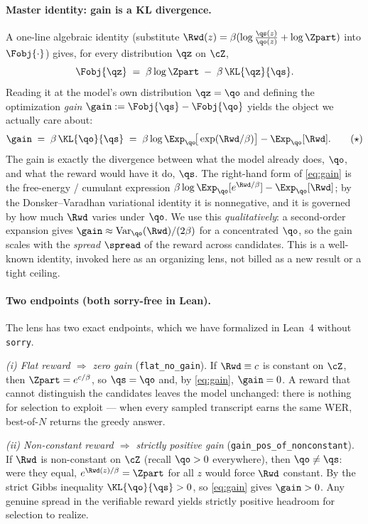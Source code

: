 \paragraph{Master identity: gain is a KL divergence.}
A one-line algebraic identity (substitute $\Rwd(z)=\beta(\log\tfrac{\qs(z)}{\qo(z)}+\log\Zpart)$ into
$\Fobj{\cdot}$) gives, for every distribution $\qz$ on $\cZ$,
\[
\Fobj{\qz} \;=\; \beta\log\Zpart \;-\; \beta\,\KL{\qz}{\qs}.
\]
Reading it at the model's own distribution $\qz=\qo$ and defining the optimization \emph{gain}
$\gain := \Fobj{\qs}-\Fobj{\qo}$ yields the object we actually care about:
\[
\gain \;=\; \beta\,\KL{\qo}{\qs}
\;=\; \beta\log\Exp_{\qo}\!\big[\exp(\Rwd/\beta)\big] - \Exp_{\qo}[\Rwd].
\tag{$\star$}\label{eq:gain}
\]
The gain is exactly the divergence between what the model already does, $\qo$, and what the reward
would have it do, $\qs$. The right-hand form of \eqref{eq:gain} is the free-energy / cumulant
expression $\beta\log\Exp_{\qo}[e^{\Rwd/\beta}]-\Exp_{\qo}[\Rwd]$; by the Donsker--Varadhan variational
identity it is nonnegative, and it is governed by how much $\Rwd$ varies under $\qo$. We use this
\emph{qualitatively}: a second-order expansion gives $\gain \approx \operatorname{Var}_{\qo}(\Rwd)/(2\beta)$
for a concentrated $\qo$, so the gain scales with the \emph{spread} $\spread$ of the reward across
candidates. This is a well-known identity, invoked here as an organizing lens, not billed as a new
result or a tight ceiling.

\paragraph{Two endpoints (both sorry-free in Lean).}
The lens has two exact endpoints, which we have formalized in Lean~4 without \texttt{sorry}.

\emph{(i) Flat reward $\Rightarrow$ zero gain} (\texttt{flat\_no\_gain}). If $\Rwd\equiv c$ is constant
on $\cZ$, then $\Zpart=e^{c/\beta}$, so $\qs=\qo$ and, by \eqref{eq:gain}, $\gain=0$. A reward that
cannot distinguish the candidates leaves the model unchanged: there is nothing for selection to
exploit --- when every sampled transcript earns the same WER, best-of-$N$ returns the greedy answer.

\emph{(ii) Non-constant reward $\Rightarrow$ strictly positive gain} (\texttt{gain\_pos\_of\_nonconstant}).
If $\Rwd$ is non-constant on $\cZ$ (recall $\qo>0$ everywhere), then $\qo\ne\qs$: were they equal,
$e^{\Rwd(z)/\beta}=\Zpart$ for all $z$ would force $\Rwd$ constant. By the strict Gibbs inequality
$\KL{\qo}{\qs}>0$, so \eqref{eq:gain} gives $\gain>0$. Any genuine spread in the verifiable reward
yields strictly positive headroom for selection to realize.

